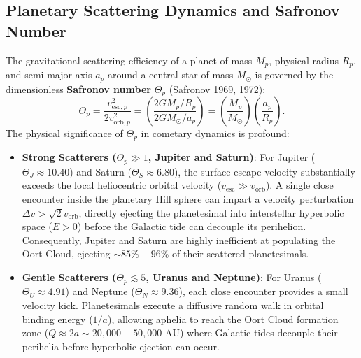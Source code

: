 \documentclass[11pt,a4paper]{article}
\begin{document}
\subsection{Planetary Scattering Dynamics and Safronov Number}
The gravitational scattering efficiency of a planet of mass $M_p$, physical radius $R_p$, and semi-major axis $a_p$ around a central star of mass $M_\odot$ is governed by the dimensionless \textbf{Safronov number} $\Theta_p$ (Safronov 1969, 1972):
\begin{equation}
\Theta_p = \frac{v_{\text{esc}, p}^2}{2 v_{\text{orb}, p}^2} = \left( \frac{2 G M_p / R_p}{2 G M_\odot / a_p} \right) = \left( \frac{M_p}{M_\odot} \right) \left( \frac{a_p}{R_p} \right).
\label{eq:safronov}
\end{equation}
The physical significance of $\Theta_p$ in cometary dynamics is profound:
\begin{itemize}
    \item \textbf{Strong Scatterers ($\Theta_p \gg 1$, Jupiter and Saturn)}: For Jupiter ($\Theta_J \approx 10.40$) and Saturn ($\Theta_S \approx 6.80$), the surface escape velocity substantially exceeds the local heliocentric orbital velocity ($v_{\text{esc}} \gg v_{\text{orb}}$). A single close encounter inside the planetary Hill sphere can impart a velocity perturbation $\Delta v > \sqrt{2} v_{\text{orb}}$, directly ejecting the planetesimal into interstellar hyperbolic space ($E > 0$) before the Galactic tide can decouple its perihelion. Consequently, Jupiter and Saturn are highly inefficient at populating the Oort Cloud, ejecting $\sim 85\% - 96\%$ of their scattered planetesimals.
    \item \textbf{Gentle Scatterers ($\Theta_p \lesssim 5$, Uranus and Neptune)}: For Uranus ($\Theta_U \approx 4.91$) and Neptune ($\Theta_N \approx 9.36$), each close encounter provides a small velocity kick. Planetesimals execute a diffusive random walk in orbital binding energy ($1/a$), allowing aphelia to reach the Oort Cloud formation zone ($Q \approx 2a \sim 20,000 - 50,000\text{ AU}$) where Galactic tides decouple their perihelia before hyperbolic ejection can occur.
\end{itemize}
\end{document}
